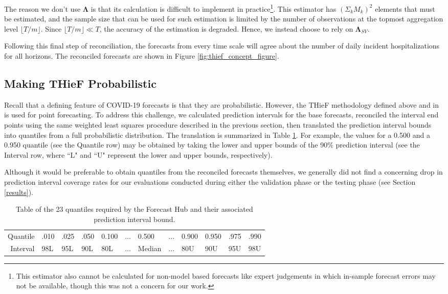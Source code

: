 \documentclass[thesis]{umassthesis}  %
\begin{document}
The reason we don't use $\boldsymbol{\Lambda}$ is that its calculation is difficult to implement in practice\footnote{This estimator also cannot be calculated for non-model based forecasts like expert judgements in which in-sample forecast errors may not be available\cite{thief}, though this was not a concern for our work.}. This estimator has $(\Sigma_k M_k)^2$ elements that must be estimated, and the sample size that can be used for such estimation is limited by the number of observations at the topmost aggregation level $\lfloor T/m \rfloor$. Since $\lfloor T/m \rfloor \ll T$, the accuracy of the estimation is degraded. Hence, we instead choose to rely on $\boldsymbol{\Lambda}_{SV}$\cite{thief}.

Following this final step of reconciliation, the forecasts from every time scale will agree about the number of daily incident hospitalizations for all horizons. The reconciled forecasts are shown in Figure \ref{fig:thief_concept_figure}.

\subsection{Making THieF Probabilistic} \label{probabilistic_thief}
Recall that a defining feature of COVID-19 forecasts is that they are probabilistic. However, the THieF methodology defined above and in \cite{thief} is used for point forecasting. To address this challenge, we calculated prediction intervals for the base forecasts, reconciled the interval end points using the same weighted least squares procedure described in the previous section, then translated the prediction interval bounds into quantiles from a full probabilistic distribution. The translation is summarized in Table \ref{tab:table_quant_int}. For example, the values for a 0.500 and a 0.950 quantile (see the Quantile row) may be obtained by taking the lower and upper bounds of the 90\% prediction interval (see the Interval row, where ``L" and ``U" represent the lower and upper bounds, respectively).

Although it would be preferable to obtain quantiles from the reconciled forecasts themselves, we generally did not find a concerning drop in prediction interval coverage rates for our evaluations conducted during either the validation phase or the testing phase (see Section \ref{results}).

\begin{table}[h]
\begin{center}
\caption{Table of the 23 quantiles required by the Forecast Hub and their associated prediction interval bound.}
\label{tab:table_quant_int}
\begin{tabular}{rlllllllllll}
  \hline
 &  \\ 
  \hline
Quantile & .010 & .025 & .050 & 0.100 & ... & 0.500 & ... & 0.900 & 0.950 & .975 & .990 \\ 
  Interval & 98L & 95L & 90L & 80L & ... & Median & ... & 80U & 90U & 95U & 98U \\ 
   \hline
\end{tabular}\end{center}
\end{table}
\end{document}

